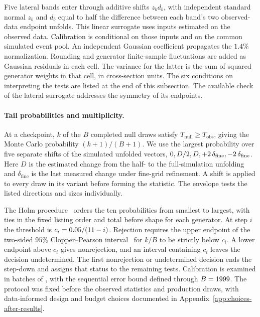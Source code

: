 Five lateral bands enter through additive shifts $z_b d_b$, with independent standard normal $z_b$ and $d_b$ equal to half the difference between each band's two observed-data endpoint unfolds. This linear surrogate uses inputs estimated on the observed data. Calibration is conditional on those inputs and on the common simulated event pool. An independent Gaussian coefficient propagates the $1.4\%$ normalization. Rounding and generator finite-sample fluctuations are added as Gaussian residuals in each cell. The variance for the latter is the sum of squared generator weights in that cell, in cross-section units. The six conditions on interpreting the tests are listed at the end of this subsection. The available check of the lateral surrogate addresses the symmetry of its endpoints.

\paragraph{Tail probabilities and multiplicity.} At a checkpoint, $k$ of the $B$ completed null draws satisfy $T_{\mathrm{null}}\geq T_{\mathrm{obs}}$, giving the Monte Carlo probability $(k+1)/(B+1)$. We use the largest probability over five separate shifts of the simulated unfolded vectors, $0,D/2,D,+2\,\delta_{\mathrm{fine}},-2\,\delta_{\mathrm{fine}}$. Here $D$ is the estimated change from the half- to the full-simulation unfolding and $\delta_{\mathrm{fine}}$ is the last measured change under fine-grid refinement. A shift is applied to every draw in its variant before forming the statistic. The envelope tests the listed directions and sizes individually.

The Holm procedure~\cite{Holm:1979} orders the ten probabilities from smallest to largest, with ties in the fixed listing order and total before shape for each generator. At step $i$ the threshold is $c_i=\jtAlpha/(\fpeval{\jtNtests+1}-i)$. Rejection requires the upper endpoint of the two-sided $95\%$ Clopper--Pearson interval~\cite{Clopper:1934} for $k/B$ to be strictly below $c_i$. A lower endpoint above $c_i$ gives nonrejection, and an interval containing $c_i$ leaves the decision undetermined. The first nonrejection or undetermined decision ends the step-down and assigns that status to the remaining tests. Calibration is examined in batches of \jtBatch{}, with the sequential error bound defined through $B=1999$. The protocol was fixed before the observed statistics and production draws, with data-informed design and budget choices documented in Appendix~\ref{app:choices-after-results}.

